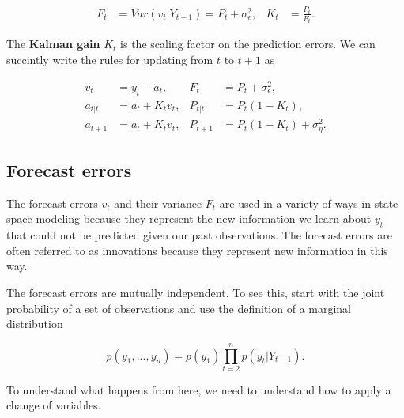\documentclass{tufte-book}
\begin{document}
\begin{align*}
F_t &= Var(v_t | Y_{t-1}) = P_t + \sigma_\epsilon^2, & K_t &= \frac{P_t}{F_t}.
\end{align*}

\noindent The \textbf{Kalman gain} $K_t$ is the scaling factor on the prediction errors. We can succintly write the rules for updating from $t$ to $t+1$ as

\begin{align*}
v_t &= y_t - a_t, & F_t &= P_t + \sigma_\epsilon^2, \\
a_{t|t} &= a_t + K_t v_t, & P_{t|t} &= P_t(1-K_t), \\
a_{t+1} &= a_t + K_t v_t, & P_{t+1} &= P_t (1-K_t) + \sigma_\eta^2.
\end{align*}

\subsection{Forecast errors}

The forecast errors $v_t$ and their variance $F_t$ are used in a variety of ways in state space modeling because they represent the new information we learn about $y_t$ that could not be predicted given our past observations. The forecast errors are often referred to as innovations because they represent new information in this way.

The forecast errors are mutually independent. To see this, start with the joint probability of a set of observations and use the definition of a marginal distribution

\[
p(y_1, ..., y_n) = p(y_1) \prod_{t = 2}^n p(y_t | Y_{t-1}).
\]

\noindent To understand what happens from here, we need to understand how to apply a change of variables.
\end{document}
